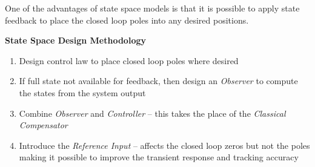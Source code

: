 \def\FileDate{10/02/02}
\def\FileVersion{1.0}

\begin{slide}
One of the advantages of state space models is that it is possible to apply state feedback to place the closed loop poles into any desired positions.

\textbf{State Space Design Methodology}

\begin{enumerate}
	\item Design control law to place closed loop poles where desired
	\item If full state not available for feedback, then design an \emph{Observer} to compute the states from the system output
	\item Combine \emph{Observer} and \emph{Controller} -- this takes the place of the \emph{Classical Compensator}
	\item Introduce the \emph{Reference Input} -- affects the closed loop zeros but not the poles making it possible to improve the transient response and tracking accuracy
\end{enumerate}	
\end{slide}

\begin{slide}
   \begin{center}
   \end{center}
\end{slide}

